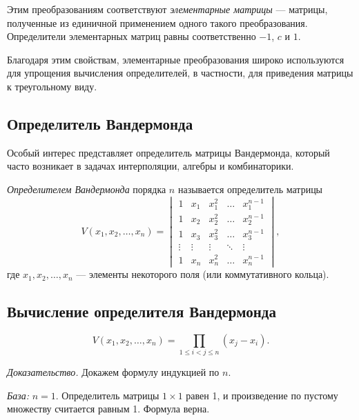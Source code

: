 \documentclass[a4paper,12pt]{article}
\theoremstyle{definition}
\theoremstyle{plain}
\theoremstyle{remark}
\begin{document}
	Этим преобразованиям соответствуют \textit{элементарные матрицы} — матрицы, полученные из единичной применением одного такого преобразования. Определители элементарных матриц равны соответственно \(-1\), \(c\) и \(1\).
	
	Благодаря этим свойствам, элементарные преобразования широко используются для упрощения вычисления определителей, в частности, для приведения матрицы к треугольному виду.
	
	\subsection{Определитель Вандермонда}
	
	Особый интерес представляет определитель матрицы Вандермонда, который часто возникает в задачах интерполяции, алгебры и комбинаторики.
	
	\begin{tcolorbox}[colback=green!5, colframe=green!50!black, title=Определение]
		\textit{Определителем Вандермонда} порядка \(n\) называется определитель матрицы
		\[
		V(x_1, x_2, \dots, x_n) = 
		\begin{vmatrix}
			1 & x_1 & x_1^2 & \dots & x_1^{n-1} \\
			1 & x_2 & x_2^2 & \dots & x_2^{n-1} \\
			1 & x_3 & x_3^2 & \dots & x_3^{n-1} \\
			\vdots & \vdots & \vdots & \ddots & \vdots \\
			1 & x_n & x_n^2 & \dots & x_n^{n-1}
		\end{vmatrix},
		\]
		где \(x_1, x_2, \dots, x_n\) — элементы некоторого поля (или коммутативного кольца).
	\end{tcolorbox}
	
	\subsection{Вычисление определителя Вандермонда}
	
	\begin{tcolorbox}[colback=red!5, colframe=red!50!black, title=Теорема (Формула Вандермонда)]
		\[
		V(x_1, x_2, \dots, x_n) = \prod_{1 \leq i < j \leq n} (x_j - x_i).
		\]
	\end{tcolorbox}
	
	\medskip
	\textit{Доказательство.}
	Докажем формулу индукцией по \(n\).
	
	\textit{База:} \(n = 1\). Определитель матрицы \(1 \times 1\) равен 1, и произведение по пустому множеству считается равным 1. Формула верна.
	
\end{document}
